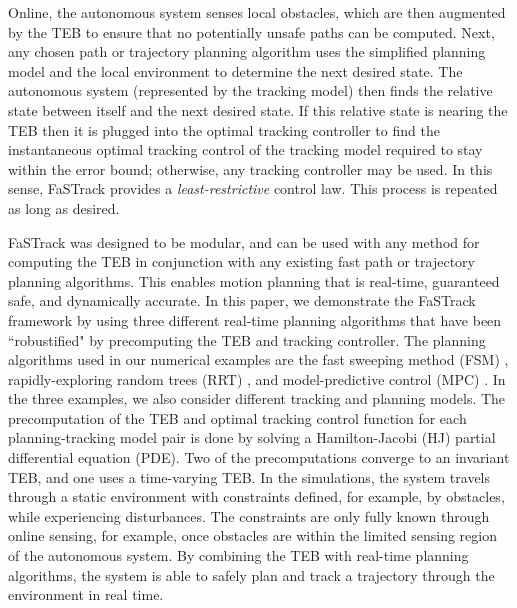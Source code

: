 Online, the autonomous system senses local obstacles, which are then augmented by the TEB to ensure that no potentially unsafe paths can be computed. 
Next, any chosen path or trajectory planning algorithm uses the simplified planning model and the local environment to determine the next desired state. 
The autonomous system (represented by the tracking model) then finds the relative state between itself and the next desired state. 
If this relative state is nearing the TEB then it is plugged into the optimal tracking controller to find the instantaneous optimal tracking control of the tracking model required to stay within the error bound; otherwise, any tracking controller may be used. In this sense, FaSTrack provides a \emph{least-restrictive} control law.
This process is repeated as long as desired. 

FaSTrack was designed to be modular, and can be used with any method for computing the TEB in conjunction with any existing fast path or trajectory planning algorithms.  
This enables motion planning that is real-time, guaranteed safe, and dynamically accurate. 
In this paper, we demonstrate the FaSTrack framework by using three different real-time planning algorithms that have been ``robustified" by precomputing the TEB and tracking controller. 
The planning algorithms used in our numerical examples are the fast sweeping method (FSM) \cite{Takei2013}, rapidly-exploring random trees (RRT) \cite{Kuffner2000,Kavraki1996}, and model-predictive control (MPC) \cite{Qin2003}. 
In the three examples, we also consider different tracking and planning models.
The precomputation of the TEB and optimal tracking control function for each planning-tracking model pair is done by solving a Hamilton-Jacobi (HJ) partial differential equation (PDE). 
Two of the precomputations converge to an invariant TEB, and one uses a time-varying TEB.
In the simulations, the system travels through a static environment with constraints defined, for example, by obstacles, while experiencing disturbances.
The constraints are only fully known through online sensing, for example, once obstacles are within the limited sensing region of the autonomous system. 
By combining the TEB with real-time planning algorithms, the system is able to safely plan and track a trajectory through the environment in real time. 